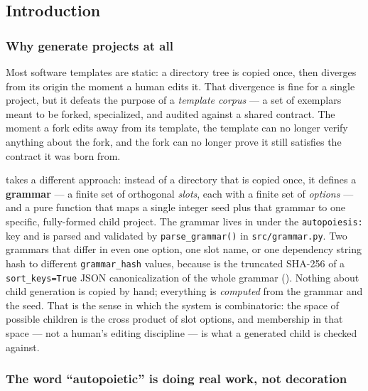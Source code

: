 \documentclass[
]{article}
\begin{document}
\newpage

\subsection{Introduction}\label{introduction}

\subsubsection{Why generate projects at
all}\label{why-generate-projects-at-all}

Most software templates are static: a directory tree is copied once,
then diverges from its origin the moment a human edits it. That
divergence is fine for a single project, but it defeats the purpose of a
\emph{template corpus} --- a set of exemplars meant to be forked,
specialized, and audited against a shared contract. The moment a fork
edits away from its template, the template can no longer verify anything
about the fork, and the fork can no longer prove it still satisfies the
contract it was born from.

 takes a different approach: instead of a
directory that is copied once, it defines a \textbf{grammar} --- a
finite set of orthogonal \emph{slots}, each with a finite set of
\emph{options} --- and a pure function that maps a single integer seed
plus that grammar to one specific, fully-formed child project. The
grammar lives in  under the
\texttt{autopoiesis:} key and is parsed and validated by
\texttt{parse\_grammar()} in \texttt{src/grammar.py}. Two grammars that
differ in even one option, one slot name, or one dependency string hash
to different \texttt{grammar\_hash} values, because
 is the truncated SHA-256 of a
\texttt{sort\_keys=True} JSON canonicalization of the whole grammar
(). Nothing about child generation is copied
by hand; everything is \emph{computed} from the grammar and the seed.
That is the sense in which the system is combinatoric: the space of
possible children is the cross product of slot options, and membership
in that space --- not a human's editing discipline --- is what a
generated child is checked against.

\subsubsection{The word ``autopoietic'' is doing real work, not
decoration}\label{the-word-autopoietic-is-doing-real-work-not-decoration}
\end{document}
